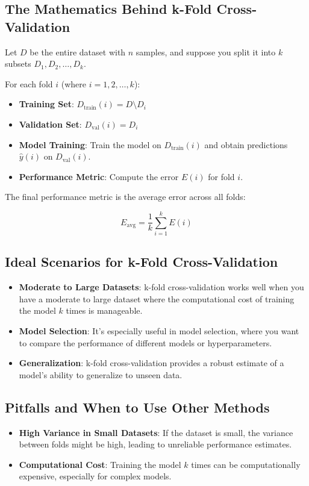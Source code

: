 \documentclass[10pt]{article}
\begin{document}
\subsection{The Mathematics Behind k-Fold Cross-Validation}
Let \(D\) be the entire dataset with \(n\) samples, and suppose you split it into \(k\) subsets \(D_1, D_2, \dots, D_k\).

For each fold \(i\) (where \(i = 1, 2, \dots, k\)):

\begin{itemize}
    \item \textbf{Training Set}: \(D_{\text{train}}(i) = D \setminus D_i\)
    \item \textbf{Validation Set}: \(D_{\text{val}}(i) = D_i\)
    \item \textbf{Model Training}: Train the model on \(D_{\text{train}}(i)\) and obtain predictions \(\hat{y}(i)\) on \(D_{\text{val}}(i)\).
    \item \textbf{Performance Metric}: Compute the error \(E(i)\) for fold \(i\).
\end{itemize}

The final performance metric is the average error across all folds:

\[
E_{\text{avg}} = \frac{1}{k} \sum_{i=1}^{k} E(i)
\]

\subsection{Ideal Scenarios for k-Fold Cross-Validation}
\begin{itemize}
    \item \textbf{Moderate to Large Datasets}: k-fold cross-validation works well when you have a moderate to large dataset where the computational cost of training the model \(k\) times is manageable.
    \item \textbf{Model Selection}: It's especially useful in model selection, where you want to compare the performance of different models or hyperparameters.
    \item \textbf{Generalization}: k-fold cross-validation provides a robust estimate of a model's ability to generalize to unseen data.
\end{itemize}

\subsection{Pitfalls and When to Use Other Methods}
\begin{itemize}
    \item \textbf{High Variance in Small Datasets}: If the dataset is small, the variance between folds might be high, leading to unreliable performance estimates.
    \item \textbf{Computational Cost}: Training the model \(k\) times can be computationally expensive, especially for complex models.
\end{itemize}
\end{document}
